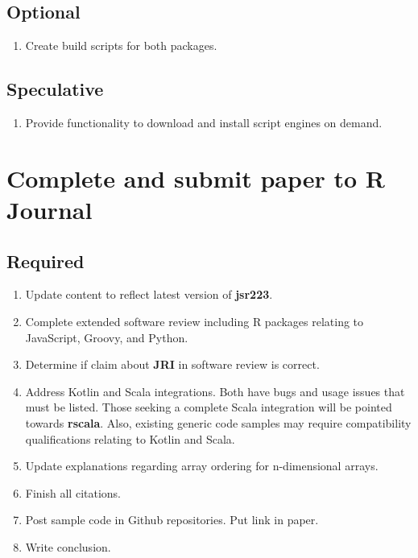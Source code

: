 \subsection{Optional}

\begin{enumerate}
\item Create build scripts for both packages.
\end{enumerate}

\subsection{Speculative}

\begin{enumerate}
\item Provide functionality to download and install script engines on demand.
\end{enumerate}

\clearpage
\section{Complete and submit paper to R Journal}

\subsection{Required}

\begin{enumerate}
\item Update content to reflect latest version of \textbf{jsr223}.

\item Complete extended software review including R packages relating to JavaScript, Groovy, and Python.

\item Determine if claim about \textbf{JRI} in software review is correct.

\item Address Kotlin and Scala integrations. Both have bugs and usage issues that must be listed. Those seeking a complete Scala integration will be pointed towards \textbf{rscala}. Also, existing generic code samples may require compatibility qualifications relating to Kotlin and Scala.

\item Update explanations regarding array ordering for n-dimensional arrays.

\item Finish all citations.

\item Post sample code in Github repositories. Put link in paper.

\item Write conclusion.
\end{enumerate}

